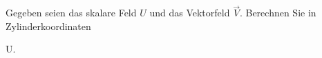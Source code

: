 \begin{atiTask}[
  title = Differentialoperatoren in Zylinderkoordinaten
]

Gegeben seien das skalare Feld $U$ und das Vektorfeld $\vec{V}$. Berechnen Sie in Zylinderkoordinaten 
\begin{atiSubequations}
	 \item{\divergence {}}
	 \item{\Delta U.}
\end{atiSubequations}



\end{atiTask}

\begin{atiSolution}
	
\end{atiSolution}